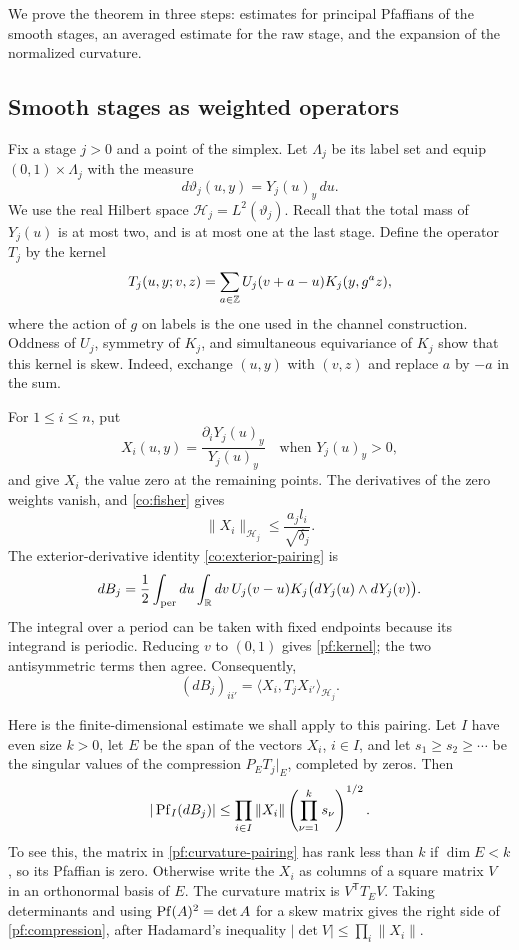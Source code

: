 We prove the theorem in three steps: estimates for principal Pfaffians
of the smooth stages, an averaged estimate for the raw stage, and the
expansion of the normalized curvature.

\subsection{Smooth stages as weighted operators}

Fix a stage $j>0$ and a point of the simplex.  Let $\Lambda_j$ be its
label set and equip $(0,1)\times\Lambda_j$ with the measure
\[
 d\vartheta_j(u,y)=Y_j(u)_y\,du.
\]
We use the real Hilbert space $\mathcal H_j=L^2(\vartheta_j)$.  Recall that
the total mass of $Y_j(u)$ is at most two, and is at most one at the
last stage.  Define the operator $T_j$ by the kernel
\begin{equation}
 T_j(u,y;v,z)
   =\sum_{a\in\mathbb Z}U_j(v+a-u)K_j(y,g^a z),
 \label{pf:kernel}
\end{equation}
where the action of $g$ on labels is the one used in the channel
construction.  Oddness of $U_j$, symmetry of $K_j$, and simultaneous
equivariance of $K_j$ show that this kernel is skew.  Indeed, exchange
$(u,y)$ with $(v,z)$ and replace $a$ by $-a$ in the sum.

For $1\le i\le n$, put
\[
 X_i(u,y)=\frac{\partial_iY_j(u)_y}{Y_j(u)_y}
 \quad\text{when }Y_j(u)_y>0,
\]
and give $X_i$ the value zero at the remaining points.  The derivatives
of the zero weights vanish, and \eqref{co:fisher} gives
\begin{equation}
 \|X_i\|_{\mathcal H_j}
 \le \frac{a_jl_i}{\sqrt{\delta_j}}.
 \label{pf:vector-norm}
\end{equation}
The exterior-derivative identity \eqref{co:exterior-pairing} is
\[
 dB_j=\frac12\int_{\rm per}du\int_{\mathbb R}dv\,
       U_j(v-u)K_j\bigl(dY_j(u)\wedge dY_j(v)\bigr).
\]
The integral over a period can be taken with fixed endpoints because
its integrand is periodic.  Reducing $v$ to $(0,1)$ gives
\eqref{pf:kernel}; the two antisymmetric terms then agree.  Consequently,
\begin{equation}
 (dB_j)_{ii'}=\langle X_i,T_jX_{i'}\rangle_{\mathcal H_j}.
 \label{pf:curvature-pairing}
\end{equation}

Here is the finite-dimensional estimate we shall apply to this pairing.
Let $I$ have even size $k>0$, let $E$ be the span of the vectors $X_i$,
$i\in I$, and let $s_1\ge s_2\ge\cdots$ be the singular values of the
compression $P_ET_j|_E$, completed by zeros.  Then
\begin{equation}
 |\operatorname{Pf}_I(dB_j)|
 \le \prod_{i\in I}\|X_i\|
       \left(\prod_{\nu=1}^k s_\nu\right)^{1/2}.
 \label{pf:compression}
\end{equation}
To see this, the matrix in \eqref{pf:curvature-pairing} has rank less
than $k$ if $\dim E<k$, so its Pfaffian is zero.  Otherwise write the
$X_i$ as columns of a square matrix $V$ in an orthonormal basis of $E$.
The curvature matrix is $V^{\mathsf T}T_EV$.  Taking determinants and
using $\operatorname{Pf}(A)^2=\det A$ for a skew matrix gives the right side of
\eqref{pf:compression}, after Hadamard's inequality
$|\det V|\le\prod_i\|X_i\|$.

